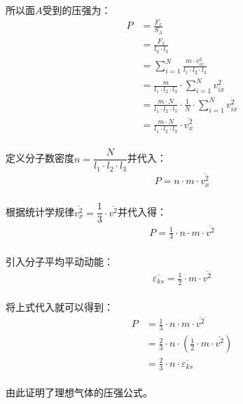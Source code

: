 \documentclass[UTF8]{ctexart}
\begin{document}
    所以面$A$受到的压强为：
    \begin{align}
        P
        &=\frac{F_x}{S_A}\\[3mm]
        &=\frac{F_x}{l_2\cdot l_3}\\[3mm]
        &=\sum_{i=1}^{N}\frac{m\cdot v_{ix}^2}{l_1\cdot l_2\cdot l_3}\\[3mm]
        &=\frac{m}{l_1\cdot l_2\cdot l_3}\cdot\sum_{i=1}^{N}v_{ix}^2\\[3mm]
        &=\frac{m\cdot N}{l_1\cdot l_2\cdot l_3}\cdot\frac{1}{N}\cdot\sum_{i=1}^{N}v_{ix}^2\\[3mm]
        &=\frac{m\cdot N}{l_1\cdot l_2\cdot l_3}\cdot\overline{v_x^2}
    \end{align}\\
    定义分子数密度$n=\dfrac{N}{l_1\cdot l_2\cdot l_3}$并代入：
    \begin{align}
        P=n\cdot m\cdot\overline{v_x^2}
    \end{align}\\
    根据统计学规律$\overline{v_x^2}=\dfrac{1}{3}\cdot\overline{v^2}$并代入得：
    \begin{align}
        P=\frac{1}{3}\cdot n\cdot m\cdot\overline{v^2}
    \end{align}\\
    引入分子平均平动动能：
    \begin{align}
        \overline{\varepsilon_{ks}}=\frac{1}{2}\cdot m\cdot\overline{v^2}
    \end{align}\\
    将上式代入就可以得到：
    \begin{align}
        P
        &=\frac{1}{3}\cdot n\cdot m\cdot\overline{v^2}\\[3mm]
        &=\frac{2}{3}\cdot n\cdot\left(\frac{1}{2}\cdot m\cdot\overline{v^2}\right)\\[3mm]
        &=\frac{2}{3}\cdot n\cdot\overline{\varepsilon_{ks}}
    \end{align}\\
    由此证明了理想气体的压强公式。

\newpage
\end{document}
